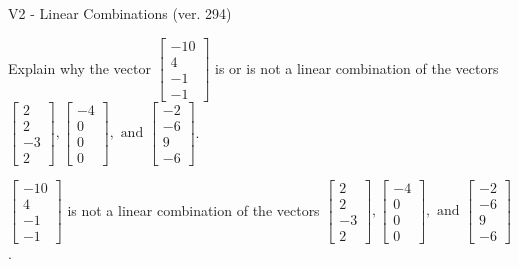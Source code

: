 \begin{exercise}
  \begin{exerciseTitle}V2 - Linear Combinations (ver. 294)\end{exerciseTitle}
  \begin{exerciseStatement}
    Explain why the vector \(\left[\begin{array}{c}
-10 \\
4 \\
-1 \\
-1
\end{array}\right]\)  is or is not a linear 
	combination of the vectors \(\left[\begin{array}{c}
2 \\
2 \\
-3 \\
2
\end{array}\right] , \left[\begin{array}{c}
-4 \\
0 \\
0 \\
0
\end{array}\right] , \text{ and } \left[\begin{array}{c}
-2 \\
-6 \\
9 \\
-6
\end{array}\right]\).
	


  \end{exerciseStatement}
  \begin{exerciseAnswer}
   \(\left[\begin{array}{c}
-10 \\
4 \\
-1 \\
-1
\end{array}\right]\) 
  	 is not  
	a linear combination of the vectors \(\left[\begin{array}{c}
2 \\
2 \\
-3 \\
2
\end{array}\right] , \left[\begin{array}{c}
-4 \\
0 \\
0 \\
0
\end{array}\right] , \text{ and } \left[\begin{array}{c}
-2 \\
-6 \\
9 \\
-6
\end{array}\right]\).

	
  


  \end{exerciseAnswer}
\end{exercise}